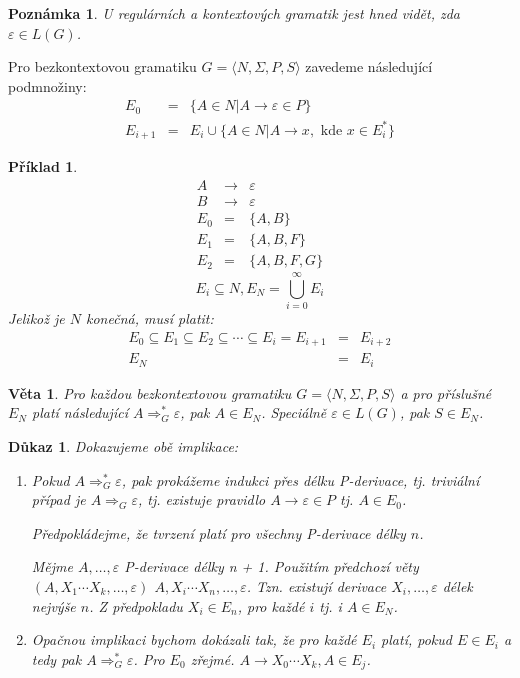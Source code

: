 \documentclass[10pt, a4paper, titlepage]{article}
\theoremstyle{note}
\newtheorem{dukaz}{Důkaz}
\newtheorem{veta}{Věta}
\newtheorem{priklad}{Příklad}
\newtheorem{poznamka}{Poznámka}
\begin{document}
\begin{poznamka}
U regulárních a kontextových gramatik jest hned vidět, zda $\varepsilon \in L(G)$.
\end{poznamka}

Pro bezkontextovou gramatiku $G = \langle N, \Sigma, P,S \rangle$ zavedeme následující podmnožiny:
\begin{eqnarray*}
E_{0} &=& \lbrace A \in N | A \rightarrow \varepsilon \in P \rbrace \\
E_{i+1} &=& E_{i} \cup \lbrace A \in N | A \rightarrow x, \text{ kde } x \in E_{i}^* \rbrace
\end{eqnarray*}

\begin{priklad}
\begin{eqnarray*}
A &\rightarrow& \varepsilon \\
B &\rightarrow& \varepsilon \\
E_{0} &=& \lbrace A, B \rbrace \\
E_{1} &=& \lbrace A, B, F \rbrace \\
E_{2} &=& \lbrace A, B, F, G \rbrace
\end{eqnarray*}
$$
E_{i} \subseteq N, E_{N} = \bigcup_{i=0}^{\infty} E_{i}
$$
Jelikož je $N$ konečná, musí platit:
\begin{eqnarray*}
E_{0} \subseteq E_{1} \subseteq E_{2} \subseteq \cdots \subseteq E_{i} = E_{i+1} &=& E_{i+2} \\
E_{N} &=& E_{i}
\end{eqnarray*}
\end{priklad}

\begin{veta}
Pro každou bezkontextovou gramatiku $G = \langle N, \Sigma, P,S \rangle$ a pro příslušné $E_{N}$ platí následující $A \Rightarrow_{G}^{*}\varepsilon$, pak $A \in E_{N}$. 
Speciálně $\varepsilon \in L(G)$, pak $S \in E_{N}$.
\end{veta}

\begin{dukaz}
Dokazujeme obě implikace:
\begin{enumerate}
\item
Pokud $A \Rightarrow_{G}^{*}\varepsilon$, pak prokážeme indukci přes délku P-derivace, tj. triviální případ je $A \Rightarrow_{G}\varepsilon$, 
tj. existuje pravidlo $A \rightarrow \varepsilon \in P$ tj. $A \in E_{0}$.

Předpokládejme, že tvrzení platí pro všechny P-derivace délky $n$.

Mějme $A, \ldots, \varepsilon$ P-derivace délky n + 1. Použitím předchozí věty $(A, X_{1} \cdots X_{k}, \ldots, \varepsilon)$ $A, X_{i} \cdots X_{n}, \ldots, \varepsilon$.
Tzn. existují derivace $X_{i}, \ldots, \varepsilon$ délek nejvýše $n$. Z předpokladu $X_{i} \in E_{n}$, pro každé $i$ tj. i $A \in E_{N}$. 

\item
Opačnou implikaci bychom dokázali tak, že pro každé $E_{i}$ platí, pokud $E \in E_{i}$ a tedy pak $A \Rightarrow_{G}^{*}\varepsilon$. Pro $E_{0}$ zřejmé.
$A \rightarrow X_{0} \cdots X_{k}, A \in E_{j}$.
\end{enumerate}
\end{dukaz}
\end{document}
